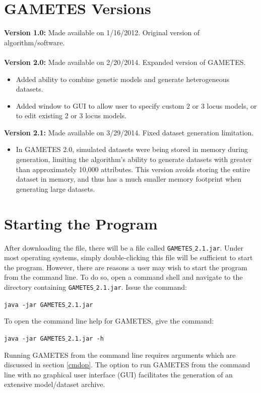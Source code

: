 \documentclass{report}
\begin{document}
\section{GAMETES Versions} 
\textbf{Version 1.0:} Made available on 1/16/2012. Original version of algorithm/software.\\ \\
\textbf{Version 2.0:} Made available on 2/20/2014. Expanded version of GAMETES.
\begin{itemize}
\item  Added ability to combine genetic models and generate heterogeneous datasets.
\item  Added window to GUI to allow user to specify custom 2 or 3 locus models, or to edit existing 2 or 3 locus models.
\end{itemize} 
\textbf{Version 2.1:} Made available on 3/29/2014. Fixed dataset generation limitation.
\begin{itemize}
\item  In GAMETES 2.0, simulated datasets were being stored in memory during generation, limiting the algorithm's ability to generate datasets with greater than approximately 10,000 attributes.  This version avoids storing the entire dataset in memory, and thus has a much smaller memory footprint when generating large datasets.
\end{itemize}

\section{Starting the Program} 
After downloading the file, there will be a file called \texttt{GAMETES$\_$2.1.jar}.  Under most operating systems, simply double-clicking this file will be sufficient to start the program.  However, there are reasons a user may wish to start the program from the command line.  To do so, open a command shell and navigate to the directory containing \texttt{GAMETES$\_$2.1.jar}.  Issue the command:
\begin{center}
\texttt{java -jar GAMETES$\_$2.1.jar}
\end{center}
To open the command line help for GAMETES, give the command:
\begin{center}
\texttt{java -jar GAMETES$\_$2.1.jar -h}
\end{center}
Running GAMETES from the command line requires arguments which are discussed in section \ref{cmdop}.  The option to run GAMETES from the command line with no graphical user interface (GUI) facilitates the generation of an extensive model/dataset archive.
\end{document}
